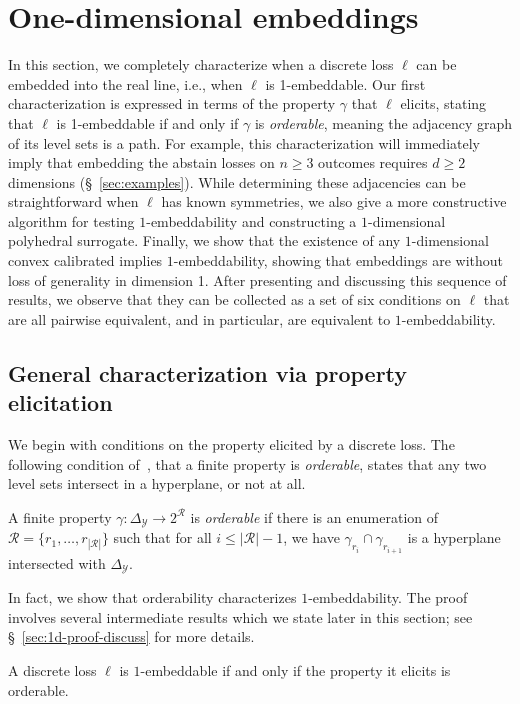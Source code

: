 \documentclass[anon]{colt2020} %
\newcommand{\simplex}{\Delta_\Y}
\newcommand{\R}{\mathcal{R}}
\newcommand{\Y}{\mathcal{Y}}
\begin{document}
\section{One-dimensional embeddings}
\label{sec:1d}

In this section, we completely characterize when a discrete loss $\ell$ can be embedded into the real line, i.e., when $\ell$ is 1-embeddable.
Our first characterization is expressed in terms of the property $\gamma$ that $\ell$ elicits, stating that $\ell$ is 1-embeddable if and only if $\gamma$ is \emph{orderable}, meaning the adjacency graph of its level sets is a path.
For example, this characterization will immediately imply that embedding the abstain losses on $n \geq 3$ outcomes requires $d \geq 2$ dimensions (\S~\ref{sec:examples}).
While determining these adjacencies can be straightforward when $\ell$ has known symmetries, we also give a more constructive algorithm for testing $1$-embeddability and constructing a $1$-dimensional polyhedral surrogate.
Finally, we show that the existence of any $1$-dimensional convex calibrated implies $1$-embeddability, showing that embeddings are without loss of generality in dimension 1.
After presenting and discussing this sequence of results, we observe that they can be collected as a set of six conditions on $\ell$ that are all pairwise equivalent, and in particular, are equivalent to $1$-embeddability.

\subsection{General characterization via property elicitation}

We begin with conditions on the property elicited by a discrete loss.
The following condition of~\citet[Theorem 3]{lambert2018elicitation}, that a finite property is \emph{orderable}, states that any two level sets intersect in a hyperplane, or not at all.
\begin{definition}[Orderable]\label{def:orderable-hyperplane}
	A finite property $\gamma:\simplex \to 2^\R$ is \emph{orderable} if there is an enumeration of $\R = \{r_1, \ldots, r_{|\R|}\}$ such that for all $i \leq |\R| - 1$, we have $\gamma_{r_i} \cap \gamma_{r_{i+1}}$ is a hyperplane intersected with $\simplex$.
\end{definition}

In fact, we show that orderability characterizes $1$-embeddability.
The proof involves several intermediate results which we state later in this section; see \S~\ref{sec:1d-proof-discuss} for more details. 
\begin{theorem} \label{thm:orderable-iff-1d}
  A discrete loss $\ell$ is $1$-embeddable if and only if the property it elicits is orderable.
\end{theorem}
\end{document}
